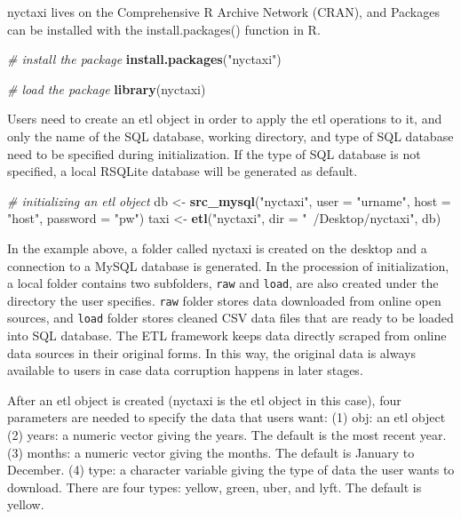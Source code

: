 \documentclass[12pt,twoside]{reedthesis}
\newenvironment{Shaded}{\begin{snugshade}}{\end{snugshade}}
\newcommand{\KeywordTok}[1]{\textcolor[rgb]{0.13,0.29,0.53}{\textbf{#1}}}
\newcommand{\DataTypeTok}[1]{\textcolor[rgb]{0.13,0.29,0.53}{#1}}
\newcommand{\StringTok}[1]{\textcolor[rgb]{0.31,0.60,0.02}{#1}}
\newcommand{\CommentTok}[1]{\textcolor[rgb]{0.56,0.35,0.01}{\textit{#1}}}
\newcommand{\NormalTok}[1]{#1}
\theoremstyle{definition}
\theoremstyle{definition}
\theoremstyle{definition}
\theoremstyle{remark}
\begin{document}
nyctaxi lives on the Comprehensive R Archive Network (CRAN), and
Packages can be installed with the install.packages() function in R.
\begin{Shaded}
\begin{Highlighting}[]
\CommentTok{# install the package}
\KeywordTok{install.packages}\NormalTok{(}\StringTok{"nyctaxi"}\NormalTok{)}
\end{Highlighting}
\end{Shaded}
\begin{Shaded}
\begin{Highlighting}[]
\CommentTok{# load the package}
\KeywordTok{library}\NormalTok{(nyctaxi)}
\end{Highlighting}
\end{Shaded}
Users need to create an etl object in order to apply the etl operations
to it, and only the name of the SQL database, working directory, and
type of SQL database need to be specified during initialization. If the
type of SQL database is not specified, a local RSQLite database will be
generated as default.
\begin{Shaded}
\begin{Highlighting}[]
\CommentTok{# initializing an etl object}
\NormalTok{db <-}\StringTok{ }\KeywordTok{src_mysql}\NormalTok{(}\StringTok{"nyctaxi"}\NormalTok{, }\DataTypeTok{user =} \StringTok{"urname"}\NormalTok{, }\DataTypeTok{host =} \StringTok{"host"}\NormalTok{, }
    \DataTypeTok{password =} \StringTok{"pw"}\NormalTok{)}
\NormalTok{taxi <-}\StringTok{ }\KeywordTok{etl}\NormalTok{(}\StringTok{"nyctaxi"}\NormalTok{, }\DataTypeTok{dir =} \StringTok{"~/Desktop/nyctaxi"}\NormalTok{, db)}
\end{Highlighting}
\end{Shaded}
In the example above, a folder called nyctaxi is created on the desktop
and a connection to a MySQL database is generated. In the procession of
initialization, a local folder contains two subfolders, \texttt{raw} and
\texttt{load}, are also created under the directory the user specifies.
\texttt{raw} folder stores data downloaded from online open sources, and
\texttt{load} folder stores cleaned CSV data files that are ready to be
loaded into SQL database. The ETL framework keeps data directly scraped
from online data sources in their original forms. In this way, the
original data is always available to users in case data corruption
happens in later stages.

After an etl object is created (nyctaxi is the etl object in this case),
four parameters are needed to specify the data that users want: (1) obj:
an etl object (2) years: a numeric vector giving the years. The default
is the most recent year. (3) months: a numeric vector giving the months.
The default is January to December. (4) type: a character variable
giving the type of data the user wants to download. There are four
types: yellow, green, uber, and lyft. The default is yellow.
\end{document}
